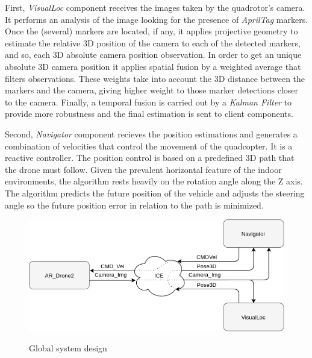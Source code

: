 \documentclass{styles/svproc}
\begin{document}
	
	First, \textit{VisualLoc} component receives the images taken by the quadrotor's camera. It performs an analysis of the image looking for the presence of \textit{AprilTag} markers. Once the (several) markers are located, if any, it applies projective geometry to estimate the relative 3D position of the camera to each of the detected markers, and so, each 3D absolute camera position observation. In order to get an unique absolute 3D camera position it applies spatial fusion by a weighted average that filters observations. These weights take into account the 3D distance between the markers and the camera, giving higher weight to those marker detections closer to the camera. Finally, a temporal fusion is carried out by a \textit{Kalman Filter} to provide more robustness and the final estimation is sent to client components.

        Second, \textit{Navigator} component recieves the position estimations and generates a combination of velocities that control the movement of the quadcopter. It is a reactive controller. The position control is based on a predefined 3D path that the drone must follow. Given the prevalent horizontal feature of the indoor environments, the algorithm rests heavily on the rotation angle along the Z axis. The algorithm predicts the future position of the vehicle and adjusts the steering angle so the future position error in relation to the path is minimized.

        \begin{figure}[h]
          \begin{center}
            {\includegraphics[width=\linewidth]{interactuacionproj.png}}
          \end{center}
          \caption{Global system design}
          \label{fig:design}
	\end{figure}
        
\end{document}
